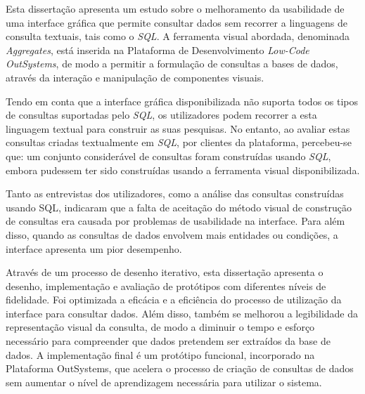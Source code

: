 Esta dissertação apresenta um estudo sobre o melhoramento da usabilidade de uma interface gráfica que permite consultar dados sem recorrer a linguagens de consulta textuais, tais como o \textit{SQL}. A ferramenta visual abordada, denominada \textit{Aggregates}, está inserida na Plataforma de Desenvolvimento \textit{Low-Code} \textit{OutSystems}, de modo a permitir a formulação de consultas a bases de dados, através da interação e manipulação de componentes visuais.

Tendo em conta que a interface gráfica disponibilizada não suporta todos os tipos de consultas suportadas pelo \textit{SQL}, os utilizadores podem recorrer a esta linguagem textual para construir as suas pesquisas. No entanto, ao avaliar estas consultas criadas textualmente em \textit{SQL}, por clientes da plataforma, percebeu-se que: um conjunto considerável de consultas foram construídas usando \textit{SQL}, embora pudessem ter sido construídas usando a ferramenta visual disponibilizada.

Tanto as entrevistas dos utilizadores, como a análise das consultas construídas usando SQL, indicaram que a falta de aceitação do método visual de construção de consultas era causada por problemas de usabilidade na interface. Para além disso, quando as consultas de dados envolvem mais entidades ou condições, a interface apresenta um pior desempenho.

Através de um processo de desenho iterativo, esta dissertação apresenta o desenho, implementação e avaliação de protótipos com diferentes níveis de fidelidade. Foi optimizada a eficácia e a eficiência do processo de utilização da interface para consultar dados. Além disso, também se melhorou a legibilidade da representação visual da consulta, de modo a diminuir o tempo e esforço necessário para compreender que dados pretendem ser extraídos da base de dados. A implementação final é um protótipo funcional, incorporado na Plataforma OutSystems, que acelera o processo de criação de consultas de dados sem aumentar o nível de aprendizagem necessária para utilizar o sistema.


